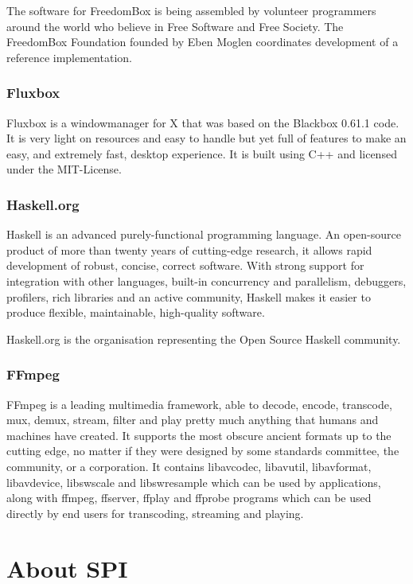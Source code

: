\documentclass[letterpaper]{report}
\begin{document}
The software for FreedomBox is being assembled by volunteer programmers around
the world who believe in Free Software and Free Society. The FreedomBox
Foundation founded by Eben Moglen coordinates development of a reference
implementation.


\subsection{Fluxbox}

Fluxbox is a windowmanager for X that was based on the Blackbox 0.61.1 code. It
is very light on resources and easy to handle but yet full of features to make
an easy, and extremely fast, desktop experience. It is built using C++ and
licensed under the MIT-License.


\subsection{Haskell.org}

Haskell is an advanced purely-functional programming language. An open-source
product of more than twenty years of cutting-edge research, it allows rapid
development of robust, concise, correct software. With strong support for
integration with other languages, built-in concurrency and parallelism,
debuggers, profilers, rich libraries and an active community, Haskell makes it
easier to produce flexible, maintainable, high-quality software.

Haskell.org is the organisation representing the Open Source Haskell community.


\subsection{FFmpeg}

FFmpeg is a leading multimedia framework, able to decode, encode, transcode,
mux, demux, stream, filter and play pretty much anything that humans and
machines have created. It supports the most obscure ancient formats up to the
cutting edge, no matter if they were designed by some standards committee, the
community, or a corporation. It contains libavcodec, libavutil, libavformat,
libavdevice, libswscale and libswresample which can be used by applications,
along with ffmpeg, ffserver, ffplay and ffprobe programs which can be used
directly by end users for transcoding, streaming and playing.


\appendix
\chapter{About SPI}
\end{document}
